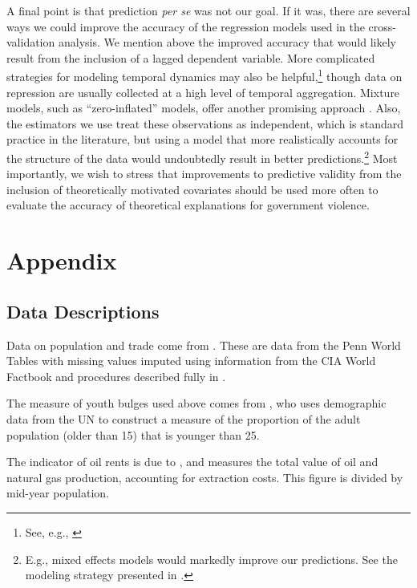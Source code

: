 \documentclass[12pt]{article}
\begin{document}
A final point is that prediction {\it per se} was not our goal. If it was, there are several ways we could improve the accuracy of the regression models used in the cross-validation analysis. We mention above the improved accuracy that would likely result from the inclusion of a lagged dependent variable. More complicated strategies for modeling temporal dynamics may also be helpful,\footnote{See, e.g., \citep{Brandtetal2011}} though data on repression are usually collected at a high level of temporal aggregation. Mixture models, such as ``zero-inflated'' models, offer another promising approach \citep[See, e.g.][]{Bagozzietal,Bagozzi2013}. Also, the estimators we use treat these observations as independent, which is standard practice in the literature, but using a model that more realistically accounts for the structure of the data would undoubtedly result in better predictions.\footnote{E.g., mixed effects models would markedly improve our predictions. See the modeling strategy presented in \citet{Wardetal2012}.} Most importantly, we wish to stress that improvements to predictive validity from the inclusion of theoretically motivated covariates should be used more often to evaluate the accuracy of theoretical explanations for government violence.

\newpage
\begin{singlespace}


\end{singlespace}

\appendix
\section{Appendix}

\subsection{Data Descriptions}

Data on population and trade come from \citet{gleditsch2002expanded}. These are data from the Penn World Tables \citep{summers1991penn} with missing values imputed using information from the CIA World Factbook and procedures described fully in \citet{gleditsch2002expanded}. 

The measure of youth bulges used above comes from \citet{Urdal2006}, who uses demographic data from the UN to construct a measure of the proportion of the adult population (older than 15) that is younger than 25.

The indicator of oil rents is due to \citet{Ross2006}, and measures the total value of oil and natural gas production, accounting for extraction costs. This figure is divided by mid-year population. 
\end{document}
